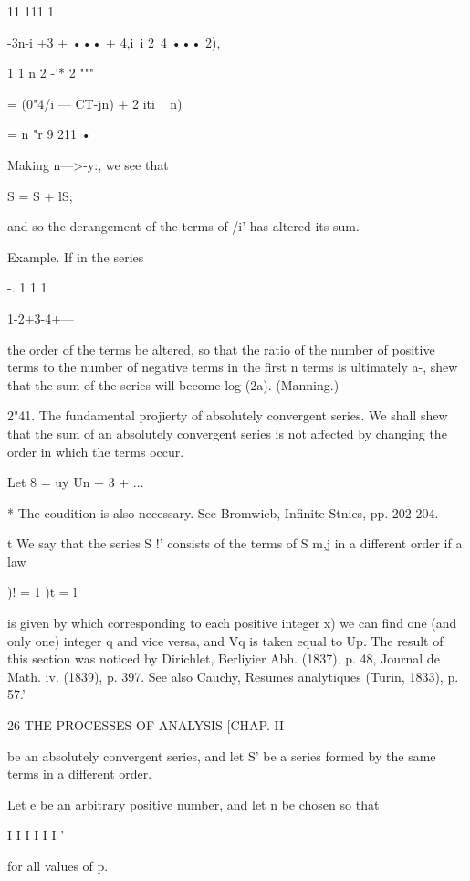  11 111 1 

-3n-i +3 + ••• + 4,i\ i 2~4 ••• 2), 




1 1 
 n 2  -'* 2 """ 




= (0"4/i — CT-jn) + 2   iti ~  n) 




=   n "r 9  211 • 



Making n—>-y:, we see that 

S = S + lS; 

and so the derangement of the terms of /i' has altered its sum. 

Example. If in the series 

-. 1 1 1 

1-2+3-4+--- 

the order of the terms be altered, so that the ratio of the number of positive terms to the 
number of negative terms in the first n terms is ultimately a-, shew that the sum of the 
series will become log (2a). (Manning.) 

2"41. The fundamental projierty of absolutely convergent series. 
We shall shew that the sum of an absolutely convergent series is not 
affected by changing the order in which the terms occur. 

Let 8 = uy  Un +  3 + ... 

* The coudition is also necessary. See Bromwicb, Infinite Stnies, pp. 202-204. 

t We say that the series S !'  consists of the terms of S m,j in a different order if a law 

)! = 1 )t = l 

is given by which corresponding to each positive integer x) we can find one (and only one) 
integer q and vice versa, and Vq is taken equal to Up. The result of this section was noticed by 
Dirichlet, Berliyier Abh. (1837), p. 48, Journal de Math. iv. (1839), p. 397. See also Cauchy, 
Resumes analytiques (Turin, 1833), p. 57.' 



26 THE PROCESSES OF ANALYSIS [CHAP. II 

be an absolutely convergent series, and let S' be a series formed by the same 
terms in a different order. 

Let e be an arbitrary positive number, and let n be chosen so that 

I I I I I I   ' 

for all values of p. 

